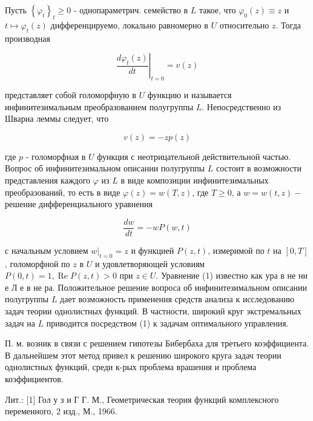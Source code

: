 \documentclass[10pt]{article}
\begin{document}
Пусть $\left\{\varphi_{t}\right\}_{t} \geqslant 0$ - однопараметрич. семейство в $L$ такое, что $\varphi_{0}(z) \equiv z$ и $t \mapsto \varphi_{t}(z)$ дифференцируемо, локально равномерно в $U$ относительно $z$. Тогда производная



\[

\left.\frac{d \varphi_{t}(z)}{d t}\right|_{t=0}=v(z)

\]



представляет собой голоморфную в $U$ функцию и называется инфинитезимальным преобразованием полугруппы $L$. Непосредственно из Швариа леммы следует, что



\[

v(z)=-z p(z)

\]



где $p$ - голоморфная в $U$ функция с неотрицательной действительной частью. Вопрос об инфинитезимальном описании полугруппы $L$ состоит в возможности представления каждого $\varphi$ из $L$ в виде композиции инфинитезимальных преобразований, то есть в виде $\varphi(z)=w(T, z)$, где $T \geqslant 0$, а $w=w(t, z)-$ решение дифференциального уравнения



\[

\frac{d w}{d t}=-w P(w, t)

\]



с начальным условием $\left.w\right|_{t=0}=z$ и функцией $P(z, t)$, измеримой по $t$ на $[0, T]$, голоморфной по $z$ в $U$ и удовлетворяющей условиям $P(0, t)=1, \operatorname{Re} P(z, t)>0$ при $z \in U$. Уравнение (1) известно как ура в не ни е Л е в не ра. Положительное решение вопроса об инфинитезимальном описании полугруппы $L$ дает возможность применения средств анализа к исследованию задач теории однолистных функций. В частности, широкий круг экстремальных задач на $L$ приводится посредством (1) к задачам оптимального управления.



П. м. возник в связи с решением гипотезы Бибербаха для третьего коэффициента. В дальнейшем этот метод привел к решению широкого круга задач теории однолистных функций, среди к-рых проблема врашения и проблема коэффициентов.



Лит.: [1] Гол у з и Г Г. М., Геометрическая теория функций комплексного переменного, 2 изд., М., 1966.
\end{document}
